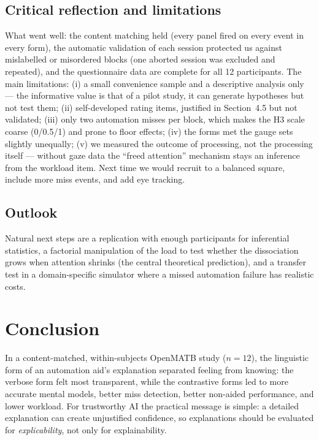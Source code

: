 \documentclass[10pt,twocolumn]{article}
\begin{document}
\subsection{Critical reflection and limitations}
What went well: the content matching held (every panel fired on every event in every form), the automatic validation of each session protected us against mislabelled or misordered blocks (one aborted session was excluded and repeated), and the questionnaire data are complete for all 12 participants. The main limitations: (i) a small convenience sample and a descriptive analysis only --- the informative value is that of a pilot study, it can generate hypotheses but not test them; (ii) self-developed rating items, justified in Section~4.5 but not validated; (iii) only two automation misses per block, which makes the H3 scale coarse (0/0.5/1) and prone to floor effects; (iv) the forms met the gauge sets slightly unequally; (v) we measured the outcome of processing, not the processing itself --- without gaze data the ``freed attention'' mechanism stays an inference from the workload item. Next time we would recruit to a balanced square, include more miss events, and add eye tracking.

\subsection{Outlook}
Natural next steps are a replication with enough participants for inferential statistics, a factorial manipulation of the load to test whether the dissociation grows when attention shrinks (the central theoretical prediction), and a transfer test in a domain-specific simulator where a missed automation failure has realistic costs.

\section{Conclusion}
In a content-matched, within-subjects OpenMATB study ($n = 12$), the linguistic form of an automation aid's explanation separated feeling from knowing: the verbose form felt most transparent, while the contrastive forms led to more accurate mental models, better miss detection, better non-aided performance, and lower workload. For trustworthy AI the practical message is simple: a detailed explanation can create unjustified confidence, so explanations should be evaluated for \textit{explicability}, not only for explainability.

%
%
\end{document}
